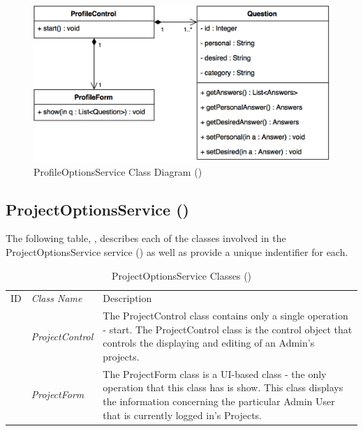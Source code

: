 \documentclass[12pt,letterpaper]{article}
\begin{document}
\begin{figure}[H]
	\centering{}
	\includegraphics[scale=0.33]{imgs/d3/interfaces/profile-options.png}
	\caption{ProfileOptionsService Class Diagram ()}
\end{figure}

\subsection{ProjectOptionsService ()}

The following table, , describes each of the classes involved in the ProjectOptionsService service () as well as provide a unique indentifier for each.

\begin{table}[H]
	\caption{ProjectOptionsService Classes ()} 
	\begin{tabu} to 
	    \tableheader{}ID & Class Name & Description \\
		 & ProjectControl & The ProjectControl class contains only a single operation - start. The ProjectControl class is the control object that controls the displaying and editing of an Admin's projects.\\
		 & ProjectForm & The ProjectForm class is a UI-based class - the only operation that this class has is show. This class displays the information concerning the particular Admin User that is currently logged in's Projects.\\
	\end{tabu}
\end{table}
\end{document}
